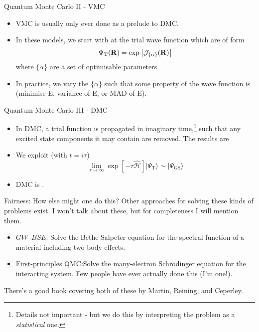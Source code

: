 \documentclass[12pt, pdf, hyperref={draft}, usenames, dvipsnames]{beamer}
\newcommand{\ket}[1]{\lvert{#1}\rangle}
\newcommand{\blue}[1]{{\bf\color{NavyBlue}{#1}}}
\newcommand{\green}[1]{{\bf\color{ForestGreen}{#1}}}
\begin{document}
\begin{frame}{Quantum Monte Carlo II - VMC}
\begin{itemize}
  \item VMC is usually only ever done as a prelude to DMC\@.
  \item In these models, we start with \blue{educated guesses} at the trial wave
  function which are of \blue{Jastrow} form
  \begin{equation}
    \Psi_{\text{T}}({\bf R}) = \exp{\left[ \mathcal{J}_{\{\alpha\}}({\bf R})\right]}
  \end{equation}
  where $\{\alpha\}$ are a set of optimisable parameters.
  \item In practice, we vary the $\{\alpha\}$ such that some property of the
  wave function is \blue{optimal} (minimise E, variance of E, or MAD of E).
\end{itemize}
\end{frame}

\begin{frame}{Quantum Monte Carlo III - DMC}
\begin{itemize}
  \item In DMC, a trial function is propagated in imaginary
  time,\footnote{Details not important - but we do this by interpreting the
  problem as a \textit{statistical} one.} such that
  any excited state components it may contain are removed. The results are
  \green{independent of the trial function (in our cases), and offer improvement over
  VMC results.}
  \item We exploit (with $t=i\tau$)
  \begin{equation}
    \lim_{\tau \rightarrow \infty} \exp{\left[ -\tau \mathcal{\hat H} \right]}
    \ket{\Psi_{\text{T}}} \sim \ket{\Psi_{\text{GS}}}
  \end{equation}

  \item DMC is \green{exact for nodeless wave functions}.

\end{itemize}
\end{frame}

\begin{frame}{Fairness: How else might one do this?}
Other approaches for solving these kinds of problems exist. I won't
talk about these, but for completeness I will mention them.
\begin{itemize}
  \item $GW$--$BSE$: Solve the Bethe-Salpeter equation for the spectral
  function of a material including two-body effects.
  \item First-principles QMC:\@ Solve the many-electron Schr\"{o}dinger
  equation for the interacting system. Few people have ever actually done this
  (I'm one!).
\end{itemize}
There's a good book covering both of these by Martin, Reining, and
Ceperley.
\end{frame}
\end{document}
